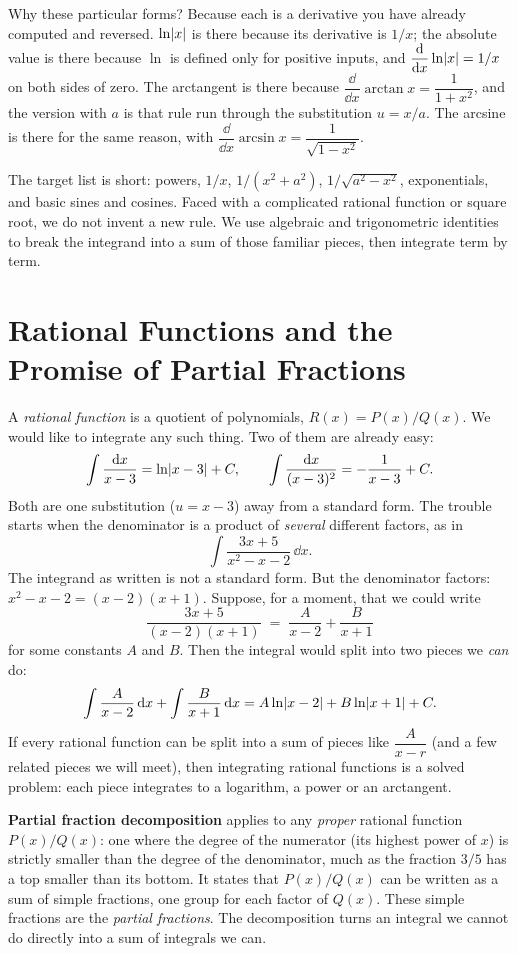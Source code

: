 Why these particular forms? Because each is a derivative you have already
computed and reversed. $\ln\lvert x\rvert$ is there because its derivative is $1/x$;
the absolute value is there because $\ln$ is defined only for positive inputs, and
$\dfrac{\mathrm{d}}{\mathrm{d} x}\ln\lvert x\rvert = 1/x$ on both sides of zero. The arctangent is
there because $\dfrac{\dd}{\dd x}\arctan x = \dfrac{1}{1+x^2}$, and the
version with $a$ is that rule run through the substitution $u = x/a$. The
arcsine is there for the same reason, with
$\dfrac{\dd}{\dd x}\arcsin x = \dfrac{1}{\sqrt{1-x^2}}$.

\begin{intuitionbox}
The target list is short: powers, $1/x$, $1/(x^2+a^2)$, $1/\sqrt{a^2-x^2}$,
exponentials, and basic sines and cosines. Faced with a complicated rational
function or square root, we do not invent a new rule. We use algebraic and
trigonometric identities to break the integrand into a sum of those familiar
pieces, then integrate term by term.
\end{intuitionbox}

\section{Rational Functions and the Promise of Partial Fractions}
\label{ch24:rational-intro}

A \emph{rational function} is a quotient of polynomials, $R(x) = P(x)/Q(x)$.
We would like to integrate any such thing. Two of them are already easy:
\[
\int \frac{\mathrm{d} x}{x - 3} = \ln\lvert x-3\rvert + C,
\qquad
\int \frac{\mathrm{d} x}{(x-3)^2} = -\frac{1}{x-3} + C.
\]
Both are one substitution ($u = x-3$) away from a standard form. The trouble
starts when the denominator is a product of \emph{several} different factors,
as in
\[
\int \frac{3x + 5}{x^2 - x - 2}\,\dd x .
\]
The integrand as written is not a standard form. But the denominator factors:
$x^2 - x - 2 = (x-2)(x+1)$. Suppose,
for a moment, that we could write
\[
\frac{3x+5}{(x-2)(x+1)} \;=\; \frac{A}{x-2} + \frac{B}{x+1}
\]
for some constants $A$ and $B$. Then the integral would split into two pieces
we \emph{can} do:
\[
\int \frac{A}{x-2}\,\mathrm{d} x + \int \frac{B}{x+1}\,\mathrm{d} x
= A\ln\lvert x-2\rvert + B\ln\lvert x+1\rvert + C.
\]
If every rational function can be split into a sum of pieces like
$\dfrac{A}{x-r}$ (and a few related pieces we will meet), then integrating
rational functions is a solved problem: each piece integrates to a logarithm,
a power or an arctangent.

\begin{focusbox}
\textbf{Partial fraction decomposition} applies to any \emph{proper} rational
function $P(x)/Q(x)$: one where the degree of the numerator (its highest power
of $x$) is strictly smaller than the degree of the denominator, much as the
fraction $3/5$ has a top smaller than its bottom. It states that $P(x)/Q(x)$
can be written as a sum of simple fractions, one group for each factor of
$Q(x)$. These simple fractions are the \emph{partial fractions}. The
decomposition turns an integral we cannot do directly into a sum of integrals
we can.
\end{focusbox}

